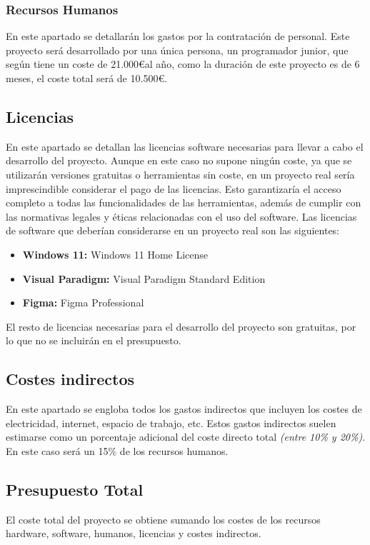 \subsubsection{Recursos Humanos}
En este apartado se detallarán los gastos por la contratación de personal. 
Este proyecto será desarrollado por una única persona, un programador junior, que según \cite{Talent2025} tiene un coste de 21.000\euro al año, como la duración de este proyecto es de 6 meses, el coste total será de 10.500\euro.


\subsection{Licencias}
En este apartado se detallan las licencias software necesarias para llevar a cabo el desarrollo del proyecto. Aunque en este caso no supone ningún coste, 
ya que se utilizarán versiones gratuitas o herramientas sin coste, en un proyecto real sería imprescindible considerar el pago de las licencias. Esto garantizaría 
el acceso completo a todas las funcionalidades de las herramientas, además de cumplir con las normativas legales y éticas relacionadas con el uso del software. Las licencias de software que deberían considerarse en un proyecto real 
son las siguientes: 
\begin{itemize}
    \item \textbf{Windows 11:} Windows 11 Home License
    \item \textbf{Visual Paradigm:} Visual Paradigm Standard Edition
    \item \textbf{Figma:} Figma Professional
\end{itemize}

El resto de licencias necesarias para el desarrollo del proyecto son gratuitas, por lo que no se incluirán en el presupuesto.


\subsection{Costes indirectos}
En este apartado se engloba todos los gastos indirectos que incluyen los costes de electricidad, internet, espacio de trabajo, etc. 
Estos gastos indirectos suelen estimarse como un porcentaje adicional del coste directo total \textit{(entre 10\% y 20\%)}.
En este caso será un 15\% de los recursos humanos.

\subsection{Presupuesto Total}
El coste total del proyecto se obtiene sumando los costes de los recursos hardware, software, humanos, licencias y costes indirectos.

